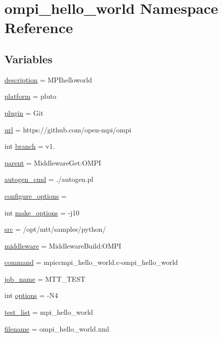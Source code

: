 \hypertarget{namespaceompi__hello__world}{\section{ompi\-\_\-hello\-\_\-world Namespace Reference}
\label{namespaceompi__hello__world}
}
\subsection*{Variables}
\begin{DoxyCompactItemize}
\item 
\hyperlink{namespaceompi__hello__world_a52b9c10821e333fe5c7413d414abeb1b}{description} = M\-P\-Ihelloworld
\item 
\hyperlink{namespaceompi__hello__world_af8ab2503d0ec334a65a72e930a24e713}{platform} = pluto
\item 
\hyperlink{namespaceompi__hello__world_a687eab84563b30840a200bfaf5407f51}{plugin} = Git
\item 
\hyperlink{namespaceompi__hello__world_ae0dcf6cc43abc8d11428686639a5059a}{url} = https\-://github.\-com/open-\/mpi/ompi
\item 
int \hyperlink{namespaceompi__hello__world_a34c1b9feb533b831fb7b0cd036494718}{branch} = v1.
\item 
\hyperlink{namespaceompi__hello__world_a5508612e06f3402554fdda7a9eca7d62}{parent} = Middleware\-Get\-:\-O\-M\-P\-I
\item 
\hyperlink{namespaceompi__hello__world_ab26bf3479d404017c9d0623f42e9dcd3}{autogen\-\_\-cmd} = ./autogen.\-pl
\item 
\hyperlink{namespaceompi__hello__world_a7b6bd890daea8a06c3daea5019b415f1}{configure\-\_\-options} =
\item 
int \hyperlink{namespaceompi__hello__world_a3b1603e3acde68a17311cb93a6a5ef12}{make\-\_\-options} = -\/j10
\item 
\hyperlink{namespaceompi__hello__world_a89cf2df98bd1f53501da343b4a25846c}{src} = /opt/mtt/samples/python/
\item 
\hyperlink{namespaceompi__hello__world_a64807561a94c3ff5b1c9a945e580f643}{middleware} = Middleware\-Build\-:\-O\-M\-P\-I
\item 
\hyperlink{namespaceompi__hello__world_a8e605d382654baee6320ca445c211c82}{command} = mpiccmpi\-\_\-hello\-\_\-world.\-c-\/ompi\-\_\-hello\-\_\-world
\item 
\hyperlink{namespaceompi__hello__world_a6aa613720eb4f4129d00b6469b68d7cf}{job\-\_\-name} = M\-T\-T\-\_\-\-T\-E\-S\-T
\item 
int \hyperlink{namespaceompi__hello__world_a4bc86d53822edfbcb8b35e8fc40d0075}{options} = -\/N4
\item 
\hyperlink{namespaceompi__hello__world_a7df798e8beb69ae3bf2537c25e7b7370}{test\-\_\-list} = mpi\-\_\-hello\-\_\-world
\item 
\hyperlink{namespaceompi__hello__world_ae42ce8011012447dba87c7337e9ddab8}{filename} = ompi\-\_\-hello\-\_\-world.\-xml
\end{DoxyCompactItemize}



